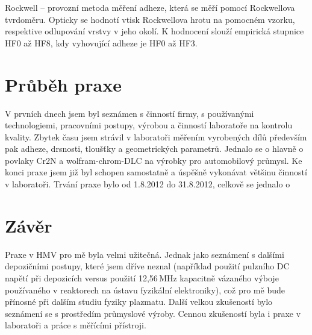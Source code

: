 \documentclass[12pt]{article}
\begin{document}
Rockwell -- provozní metoda měření adheze, která se měří pomocí Rockwellova tvrdoměru. Opticky se hodnotí vtisk Rockwellova hrotu na pomocném vzorku, respektive odlupování vrstvy v jeho okolí. K hodnocení slouží empirická stupnice HF0 až HF8, kdy vyhovující adheze je HF0 až HF3.

\section{Průběh praxe}
V prvních dnech jsem byl seznámen s činností firmy, s používanými technologiemi, pracovními postupy, výrobou a činností laboratoře na kontrolu kvality. Zbytek času jsem strávil v laboratoři měřením vyrobených dílů především pak adheze, drsnosti, tloušťky a geometrických parametrů. Jednalo se o hlavně o povlaky Cr2N a wolfram-chrom-DLC na výrobky pro automobilový průmysl. Ke konci praxe jsem již byl schopen samostatně a úspěšně vykonávat většinu činností v laboratoři. Trvání praxe bylo od 1.8.2012 do 31.8.2012, celkově se jednalo o 

\section{Závěr}
Praxe v HMV pro mě byla velmi užitečná. Jednak jako seznámení s dalšími depozičními postupy, které jsem dříve neznal (například použití pulzního DC napětí při depozicích versus použití 12,56\,MHz kapacitně vázaného výboje používaného v reaktorech na ústavu fyzikální elektroniky), což pro mě bude přínosné při dalším studiu fyziky plazmatu. Další velkou zkušeností bylo seznámení se s prostředím průmys\-lo\-vé výroby. Cennou zkušeností byla i praxe v laboratoři a práce s měřícími přístroji.
\end{document}
